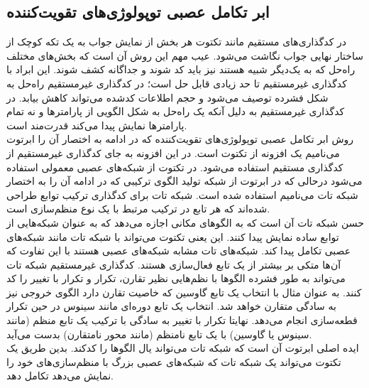 \subsection{ابر تکامل عصبی توپولوژی‌های تقویت‌کننده}
در کدگذاری‌های مستقیم مانند تکتوت هر بخش از نمایش جواب به یک تکه کوچک از ساختار نهایی جواب نگاشت می‌شود. عیب مهم این روش آن است که بخش‌های مختلف راه‌حل که به یک‌دیگر شبیه هستند نیز باید کد شوند و جداگانه کشف شوند. این ابراد با کدگذاری غیرمستقیم تا حد زیادی قابل حل است؛ در کدگذاری غیرمستقیم راه‌حل به شکل فشرده توصیف می‌شود و حجم اطلاعات کدشده می‌تواند کاهش بیابد. در کدگذاری غیرمستقیم به دلیل آنکه یک راه‌حل به شکل الگویی از پارامترها و نه تمام پارامترها نمایش پیدا می‌کند قدرت‌مند است.\cite{merrild2018hyperntm}
\\

روش ابر تکامل عصبی توپولوژی‌های تقویت‌کننده که در ادامه به اختصار آن را ابرتوت می‌نامیم یک افزونه از تکتوت است. در این افزونه به جای کدگذاری غیرمستقیم از کدگذاری مستقیم استفاده می‌شود. در تکتوت از شبکه‌های عصبی معمولی استفاده می‌شود درحالی که در ابرتوت از شبکه تولید الگوی ترکیبی که در ادامه آن را به اختصار شبکه تات می‌نامیم استفاده شده است. شبکه تات برای کدگذاری ترکیب توابع طراحی شده‌اند که هر تابع در ترکیب مرتبط با یک نوع منظم‌سازی است.\cite{merrild2018hyperntm}
\\

حسن شبکه تات آن است که به الگوهای مکانی اجازه می‌دهد که به عنوان شبکه‌هایی از توابع ساده نمایش پیدا کنند. این یعنی تکتوت می‌تواند با شبکه تات مانند شبکه‌های عصبی تکامل پیدا کند. شبکه‌های تات مشابه شبکه‌های عصبی هستند با این تفاوت که آن‌ها متکی بر بیشتر از یک تابع فعال‌سازی هستند.
کدگذاری غیرمستقیم شبکه تات می‌تواند به طور فشرده الگوها با نظم‌هایی نظیر تقارن، تکرار و تکرار با تغییر را کد کنند. به عنوان مثال با انتخاب یک تابع گاوسین که خاصیت تقارن دارد الگوی خروجی نیز به سادگی متقارن خواهد شد. انتخاب یک تابع دوره‌ای مانند سینوس در حین تکرار قطعه‌سازی انجام می‌دهد. نهایتا تکرار با تغییر به سادگی با ترکیب یک تابع منظم (مانند سینوس یا گاوسین) با یک تابع نامنظم (مانند محور  نامتقارن) بدست می‌آید.\cite{merrild2018hyperntm} 
\\

ایده اصلی ابرتوت آن است که شبکه تات می‌تواند یال الگوها را کدکند. بدین طریق یک تکتوت می‌تواند یک شبکه تات که شبکه‌های عصبی بزرگ با منظم‌سازی‌های خود را نمایش می‌دهد تکامل دهد.\cite{merrild2018hyperntm}
\\


